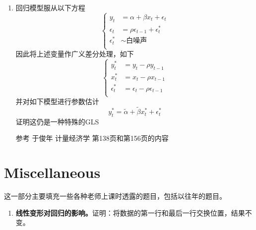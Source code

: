 \documentclass{article}
\begin{document}
\begin{enumerate}
    \item 回归模型服从以下方程
    $$
    \left\{
      \begin{aligned}
        y_t&=\alpha+\beta x_t+\epsilon_t \\
        \epsilon_t&=\rho \epsilon_{t-1}+\epsilon_t^{*} \\
        \epsilon_t^{*} &\sim \text{白噪声}\\
      \end{aligned}
    \right.
    $$
    因此将上述变量作广义差分处理，如下
    $$
    \left\{
      \begin{aligned}
        y_t^* &= y_t-\rho y_{t-1} \\
        x_t^* &= x_t-\rho x_{t-1}  \\
        \epsilon_t^* &= \epsilon_t-\rho \epsilon_{t-1} \\
      \end{aligned}
    \right.
    $$
    并对如下模型进行参数估计
    $$
      y_t^* = \widetilde{\alpha}+\widetilde{\beta}x_t^*+\epsilon_t^*
    $$
    证明这仍是一种特殊的GLS

    参考 于俊年 计量经济学 第138页和第156页的内容
\end{enumerate}

\section*{Miscellaneous}

这一部分主要填充一些各种老师上课时透露的题目，包括以往年的题目。

\begin{enumerate}
    \item \textbf{线性变形对回归的影响。}证明：将数据的第一行和最后一行交换位置，结果不变。
\end{enumerate}
\end{document}
